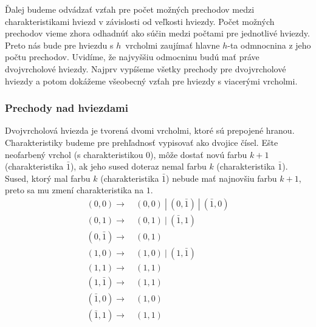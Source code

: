Ďalej budeme odvádzať vzťah pre počet možných prechodov medzi charakteristikami hviezd v závislosti od veľkosti hviezdy.
Počet možných prechodov vieme zhora odhadnúť ako súčin medzi počtami pre jednotlivé hviezdy. Preto nás bude pre hviezdu
s $h$ vrcholmi zaujímať hlavne $h$-ta odmnocnina z jeho počtu prechodov. Uvidíme, že najvyššiu odmocninu budú
mať práve dvojvrcholové hviezdy. Najprv vypíšeme všetky prechody pre dvojvrcholové hviezdy a potom dokážeme všeobecný
vzťah pre hviezdy s viacerými vrcholmi.

\subsubsection{Prechody nad hviezdami}

Dvojvrcholová hviezda je tvorená dvomi vrcholmi, ktoré sú prepojené hranou. Charakteristiky budeme pre prehľadnosť
vypisovať ako dvojice čísel. Ešte neofarbený vrchol (s charakteristikou $0$), môže dostať novú farbu $k+1$
(charakteristika $\bar{1}$), ak jeho sused doteraz nemal farbu $k$ (charakteristika $\bar{1}$).
Sused, ktorý mal farbu $k$ (charakteristika $\bar{1}$) nebude mať najnovšiu farbu $k+1$, preto sa mu
zmení charakteristika na $1$.
\begin{align*}
    (0, 0) \to &\ (0, 0) \ | \ (0, \bar{1}) \ | \ (\bar{1}, 0) \\
    (0, 1) \to &\ (0, 1) \ | \ (\bar{1}, 1) \\
    (0, \bar{1}) \to &\ (0, 1) \\
    (1, 0) \to &\ (1, 0) \ | \ (1, \bar{1}) \\
    (1, 1) \to &\ (1, 1) \\
    (1, \bar{1}) \to &\ (1, 1) \\
    (\bar{1}, 0) \to &\ (1, 0) \\
    (\bar{1}, 1) \to &\ (1, 1)
\end{align*}

